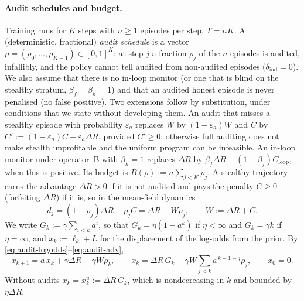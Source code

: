 \paragraph{Audit schedules and budget.} Training runs for $K$ steps with $n\ge1$
episodes per step, $T=nK$. A (deterministic, fractional) \emph{audit schedule}
is a vector $\rho=(\rho_0,\dots,\rho_{K-1})\in[0,1]^K$: at step $j$ a fraction
$\rho_j$ of the $n$ episodes is audited, infallibly, and the policy cannot tell
audited from non-audited episodes ($\delta_{\mathrm{ind}}=0$). We also assume that there is no in-loop monitor (or one that is blind on the stealthy stratum, $\beta_f=\beta_h=1$) and that an audited honest episode is never penalised (no false positive). Two extensions follow by substitution, under conditions that we state without developing them. An audit that misses a stealthy episode with probability $\varepsilon_a$ replaces $W$ by $(1-\varepsilon_a)W$ and $C$ by $C':=(1-\varepsilon_a)C-\varepsilon_a\Delta R$, provided $C'\ge0$; otherwise full auditing does not make stealth unprofitable and the uniform program can be infeasible. An in-loop monitor under operator~B with $\beta_h=1$ replaces $\Delta R$ by $\beta_f\Delta R-(1-\beta_f)C_{\mathrm{loop}}$, when this is positive. Its budget is
$B(\rho):=n\sum_{j<K}\rho_j$. A stealthy trajectory earns the advantage
$\Delta R>0$ if it is not audited and pays the penalty $C\ge0$ (forfeiting
$\Delta R$) if it is, so in the mean-field dynamics
\begin{equation}\label{eq:audit-adv}
  d_j=(1-\rho_j)\Delta R-\rho_j C=\Delta R-W\rho_j,\qquad W:=\Delta R+C .
\end{equation}
We write $G_k:=\gamma\sum_{i<k}a^i$, so that $G_k=\eta(1-a^k)$ if $\eta<\infty$
and $G_k=\gamma k$ if $\eta=\infty$, and $x_k:=\ell_k+L$ for the displacement of
the log-odds from the prior. By \eqref{eq:audit-logodds}--\eqref{eq:audit-adv},
\begin{equation}\label{eq:audit-x}
  x_{k+1}=a\,x_k+\gamma\Delta R-\gamma W\rho_k,\qquad
  x_k=\Delta R\,G_k-\gamma W\sum_{j<k}a^{\,k-1-j}\rho_j,\qquad x_0=0 .
\end{equation}
Without audits $x_k=x^{u}_k:=\Delta R\,G_k$, which is nondecreasing in $k$ and
bounded by $\eta\Delta R$.

